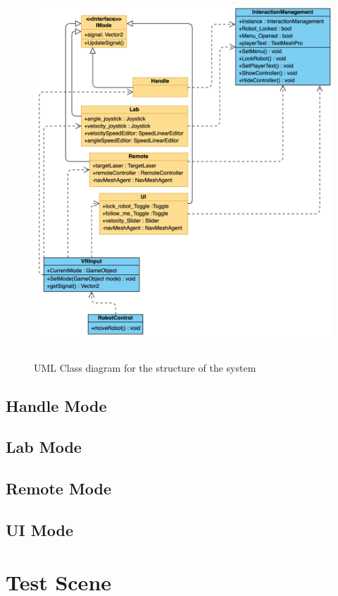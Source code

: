 \begin{figure}[h]
    \centering
    \includegraphics[height=14cm]{graphics/uml.png}
    \caption{UML Class diagram for the structure of the system}
    \label{fig:uml}
\end{figure}

\subsection{Handle Mode}
\subsection{Lab Mode}
\subsection{Remote Mode}
\subsection{UI Mode}


\section{Test Scene}